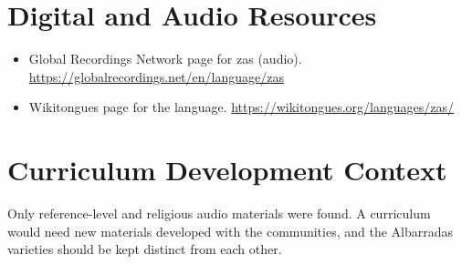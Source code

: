 \documentclass[12pt]{article}
\begin{document}
\section{Digital and Audio Resources}
\begin{itemize}
\item Global Recordings Network page for zas (audio). \url{https://globalrecordings.net/en/language/zas}
\item Wikitongues page for the language. \url{https://wikitongues.org/languages/zas/}
\end{itemize}

\section{Curriculum Development Context}
Only reference-level and religious audio materials were found. A curriculum would need new materials developed with the communities, and the Albarradas varieties should be kept distinct from each other.
\end{document}
